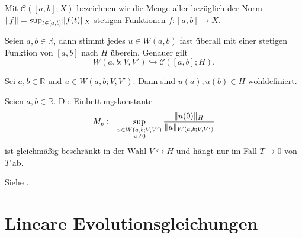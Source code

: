 \begin{Definition}
\label{def:gl:br:stetige_funktionen}
    Mit $\mathcal C([a, b]; X)$ bezeichnen wir die Menge aller bezüglich der Norm $\lVert f\rVert = \sup_{t \in [a, b]} \lVert f(t)\rVert_{X}$ stetigen Funktionen $f \colon [a, b] \to X$.
\end{Definition}

\begin{Satz}
\label{satz:gl:br:bochner_eingebettet_in_stetigen_funktionen}
    Seien $a, b \in \mathbb{R}$, dann stimmt jedes $u \in W(a, b)$ fast überall mit einer stetigen Funktion von $[a, b]$ nach $H$ überein.
    Genauer gilt
    \begin{equation}
        W(a, b; V, V') \hookrightarrow \mathcal C([a, b]; H).
    \end{equation}
\end{Satz}

\begin{Korollar}
\label{kor:gl:br:bochner_spur_wohldefiniert}
    Sei $a, b \in \mathbb{R}$ und $u \in W(a, b; V, V')$.
    Dann sind $u(a), u(b) \in H$ wohldefiniert.
\end{Korollar}

\begin{Korollar}
\label{kor:gl:br:einbettungskonstante_M_e}
    Seien $a, b \in \mathbb{R}$.
    Die Einbettungskonstante
    \begin{equation}
        \label{eq:gl:br:einbettungskonst_M_e}
        M_{e} \coloneqq \sup_{\substack{u\in W(a, b; V, V')\\u \neq 0}} \frac{\lVert u(0)\rVert_{H}}{\lVert u\rVert_{W(a, b; V, V')}}
    \end{equation}
    ist gleichmäßig beschränkt in der Wahl $V \hookrightarrow H$ und hängt nur im Fall $T \to 0$ von $T$ ab.

    \begin{Beweis}
        Siehe \textcite[Beweis zu Theorem XVIII.2.1]{Dautray:1992by}.
    \end{Beweis}
\end{Korollar}


\section{Lineare Evolutionsgleichungen} %
\label{sec:gl:le:lineare_evolutionsgleichungen}

